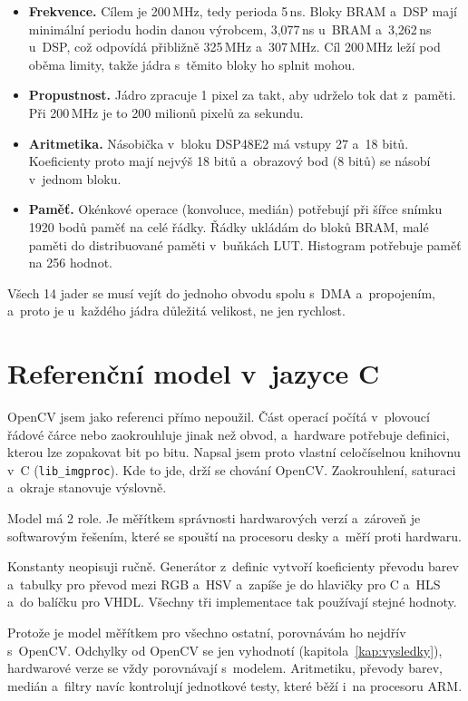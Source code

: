 \begin{itemize}
    \item \textbf{Frekvence.} Cílem je 200\,MHz, tedy perioda 5\,ns. Bloky BRAM a~DSP mají minimální periodu hodin danou výrobcem, 3,077\,ns u~BRAM a~3,262\,ns u~DSP, což odpovídá přibližně 325\,MHz a~307\,MHz. Cíl 200\,MHz leží pod oběma limity, takže jádra s~těmito bloky ho splnit mohou.
    \item \textbf{Propustnost.} Jádro zpracuje 1 pixel za takt, aby udrželo tok dat z~paměti. Při 200\,MHz je to 200 milionů pixelů za sekundu.
    \item \textbf{Aritmetika.} Násobička v~bloku DSP48E2 má vstupy 27 a~18 bitů. Koeficienty proto mají nejvýš 18 bitů a~obrazový bod (8 bitů) se násobí v~jednom bloku.
    \item \textbf{Paměť.} Okénkové operace (konvoluce, medián) potřebují při šířce snímku 1920 bodů paměť na celé řádky. Řádky ukládám do bloků BRAM, malé paměti do distribuované paměti v~buňkách LUT. Histogram potřebuje paměť na 256 hodnot.
\end{itemize}

Všech 14 jader se musí vejít do jednoho obvodu spolu s~DMA a~propojením, a~proto je u~každého jádra důležitá velikost, ne jen rychlost.

\section{Referenční model v~jazyce C}
\label{sec:model}

OpenCV jsem jako referenci přímo nepoužil. Část operací počítá v~plovoucí řádové čárce nebo zaokrouhluje jinak než obvod, a~hardware potřebuje definici, kterou lze zopakovat bit po bitu. Napsal jsem proto vlastní celočíselnou knihovnu v~C (\texttt{lib\_imgproc}). Kde to jde, drží se chování OpenCV. Zaokrouhlení, saturaci a~okraje stanovuje výslovně.

Model má 2 role. Je měřítkem správnosti hardwarových verzí a~zároveň je softwarovým řešením, které se spouští na procesoru desky a~měří proti hardwaru.

Konstanty neopisuji ručně. Generátor z~definic vytvoří koeficienty převodu barev a~tabulky pro převod mezi RGB a~HSV a~zapíše je do hlavičky pro C a~HLS a~do balíčku pro VHDL. Všechny tři implementace tak používají stejné hodnoty.

Protože je model měřítkem pro všechno ostatní, porovnávám ho nejdřív s~OpenCV. Odchylky od OpenCV se jen vyhodnotí (kapitola~\ref{kap:vysledky}), hardwarové verze se vždy porovnávají s~modelem. Aritmetiku, převody barev, medián a~filtry navíc kontrolují jednotkové testy, které běží i~na procesoru ARM.


